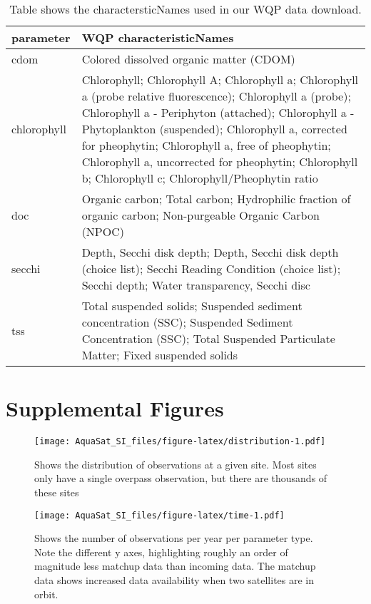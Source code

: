 \documentclass[]{article}
\begin{document}
\begin{table}[t]

\caption{\label{tab:paramters}Table shows the charactersticNames used in our WQP data download.}
\centering
\begin{tabular}{>{\raggedright\arraybackslash}p{2cm}|>{\raggedright\arraybackslash}p{13cm}}
\hline
\textbf{parameter} & \textbf{WQP characteristicNames}\\
\hline
\rowcolor{gray!6}  cdom & Colored dissolved organic matter (CDOM)\\
\hline
chlorophyll & Chlorophyll; Chlorophyll A; Chlorophyll a; Chlorophyll a (probe relative fluorescence); Chlorophyll a (probe); Chlorophyll a - Periphyton (attached); Chlorophyll a - Phytoplankton (suspended); Chlorophyll a, corrected for pheophytin; Chlorophyll a, free of pheophytin; Chlorophyll a, uncorrected for pheophytin; Chlorophyll b; Chlorophyll c; Chlorophyll/Pheophytin ratio\\
\hline
\rowcolor{gray!6}  doc & Organic carbon; Total carbon; Hydrophilic fraction of organic carbon; Non-purgeable Organic Carbon (NPOC)\\
\hline
secchi & Depth, Secchi disk depth; Depth, Secchi disk depth (choice list); Secchi Reading Condition (choice list); Secchi depth; Water transparency, Secchi disc\\
\hline
\rowcolor{gray!6}  tss & Total suspended solids; Suspended sediment concentration (SSC); Suspended Sediment Concentration (SSC); Total Suspended Particulate Matter; Fixed suspended solids\\
\hline
\end{tabular}
\end{table}

\pagebreak

\hypertarget{supplemental-figures}{%
\section{Supplemental Figures}\label{supplemental-figures}}

\begin{figure}
\centering
\texttt{[image: AquaSat\_SI\_files/figure-latex/distribution-1.pdf]}
\caption{\label{fig:distribution} Shows the distribution of observations
at a given site. Most sites only have a single overpass observation, but
there are thousands of these sites}
\end{figure}

\begin{figure}
\centering
\texttt{[image: AquaSat\_SI\_files/figure-latex/time-1.pdf]}
\caption{\label{fig:time} Shows the number of observations per year per
parameter type. Note the different y axes, highlighting roughly an order
of magnitude less matchup data than incoming data. The matchup data
shows increased data availability when two satellites are in orbit.}
\end{figure}
\end{document}
